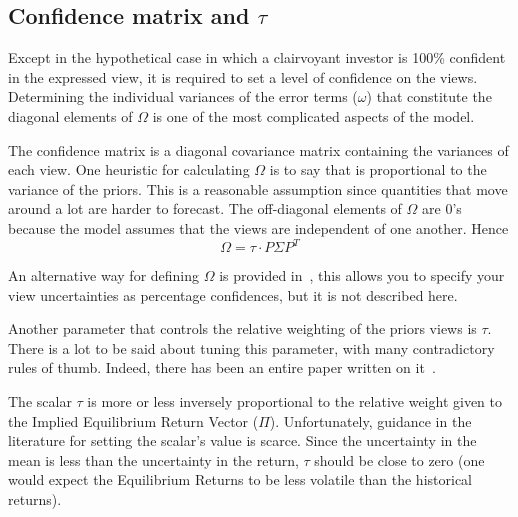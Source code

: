 \subsection{Confidence matrix and $\tau$}

Except in the hypothetical case in which a clairvoyant investor is 100\% confident in the expressed view, it is required to set a level of confidence on the views. Determining the individual variances of the error terms ($\omega$) that constitute the diagonal elements of $\Omega$ is one of the most complicated aspects of the model.

The confidence matrix is a diagonal covariance matrix containing the variances of each view. One heuristic for calculating $\Omega$ is to say that is proportional to the variance of the priors. This is a reasonable assumption since quantities that move around a lot are harder to forecast. The off-diagonal elements of $\Omega$ are 0’s because the model assumes that the views are independent of one another. Hence 
\begin{equation}
\Omega = \tau \cdot P\Sigma P^T
\end{equation}

An alternative way for defining $\Omega$ is provided in~\cite{bib:Idzorek}, this allows you to specify your view uncertainties as percentage confidences, but it is not described here.

Another parameter that controls the relative weighting of the priors views is $\tau$. There is a lot to be said about tuning this parameter, with many contradictory rules of thumb. Indeed, there has been an entire paper written on it~\cite{bib:tau}. 

The scalar $\tau$ is more or less inversely proportional to the relative weight given to the Implied Equilibrium Return Vector ($\Pi$). Unfortunately, guidance in the literature for setting the scalar’s value is scarce. Since the uncertainty in the mean is less than the uncertainty in the return, $\tau$ should be close to zero (one would expect the Equilibrium Returns to be less volatile than the historical returns).


